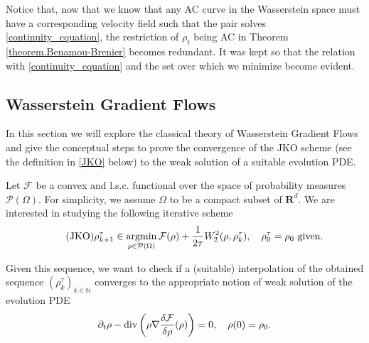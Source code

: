 \begin{remark}
	Notice that, now that we know that any AC curve in the Wasserstein space must have a corresponding velocity field such that the pair solves \eqref{continuity_equation}, the restriction of $\rho_t$ being AC in Theorem \eqref{theorem.Benamou-Brenier} becomes redundant. It was kept so that the relation with \eqref{continuity_equation} and the set over which we minimize become evident. 
\end{remark}
\subsection{Wasserstein Gradient Flows}
In this section we will explore the classical theory of Wasserstein Gradient Flows and give the conceptual steps to prove the convergence of the JKO scheme (see the definition in \eqref{JKO} below) to the weak solution of a suitable evolution PDE. 

Let $\mathcal{F}$ be a convex and l.s.c. functional over the space of probability measures $\mathcal{P}(\Omega)$. For simplicity, we assume $\Omega$ to be a compact subset of $\mathbf{R}^d$. We are interested in studying the following iterative scheme
\begin{equation}
	\label{JKO}
	\tag{JKO}
	\rho_{k+1}^{\tau} \in \mathop{\rm argmin}_{\rho \in \mathcal{P}(\Omega)} \mathcal{F}(\rho) + \frac{1}{2\tau}W^2_2(\rho, \rho^{\tau}_{k}), \quad \text{$\rho^{\tau}_0 = \rho_0$ given}. 
\end{equation}

Given this sequence, we want to check if a (suitable) interpolation of the obtained sequence $\left(\rho^{\tau}_k\right)_{k \in \mathbb{N}}$ converges to the appropriate notion of weak solution of the evolution PDE
\begin{equation}
	\partial_t\rho - \text{div}\left(\rho \nabla \frac{\delta \mathcal{F}}{\delta \rho}(\rho)\right) = 0, \quad \rho(0) = \rho_0. 
\end{equation}

